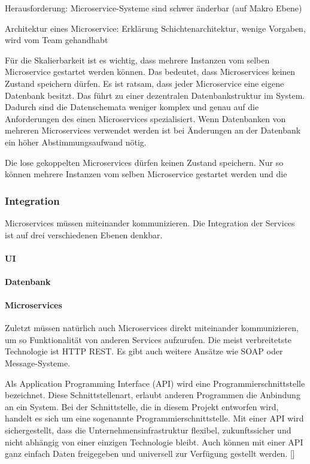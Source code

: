 Herausforderung: Microservice-Systeme sind schwer änderbar (auf Makro Ebene)

Architektur eines Microservice: Erklärung Schichtenarchitektur, wenige Vorgaben, wird vom Team gehandhabt

Für die Skalierbarkeit ist es wichtig, dass mehrere Instanzen vom selben Microservice gestartet werden können. Das bedeutet, dass Microservices keinen Zustand speichern dürfen.
Es ist ratsam, dass jeder Microservice eine eigene Datenbank besitzt. Das führt zu einer dezentralen Datenbankstruktur im System. Dadurch sind die Datenschemata weniger komplex und genau auf die Anforderungen des einen Microservices spezialisiert.  Wenn Datenbanken von mehreren Microservices verwendet werden ist bei Änderungen an der Datenbank ein höher Abstimmungsaufwand nötig.

Die lose gekoppelten Microservices dürfen keinen Zustand speichern. Nur so können mehrere Instanzen vom selben Microservice gestartet werden und die 

\subsubsection{Integration}

Microservices müssen miteinander kommunizieren. Die Integration der Services ist auf drei verschiedenen Ebenen denkbar.

\paragraph{UI}

\paragraph{Datenbank}

\paragraph{Microservices}

Zuletzt müssen natürlich auch Microservices direkt miteinander kommunizieren, um so Funktionalität von anderen Services aufzurufen. Die meist verbreitetste Technologie ist HTTP REST. Es gibt auch weitere Ansätze wie SOAP oder Message-Systeme.

Als Application Programming Interface (API) wird eine Programmierschnittstelle bezeichnet. Diese Schnittstellenart, erlaubt anderen Programmen die Anbindung an ein System. Bei der Schnittstelle, die in diesem Projekt entworfen wird, handelt es sich um eine sogenannte Programmierschnittstelle. Mit einer API wird sichergestellt, dass die Unternehmensinfrastruktur flexibel, zukunftssicher und nicht abhängig von einer einzigen Technologie bleibt. Auch können mit einer API ganz einfach Daten freigegeben und universell zur Verfügung gestellt werden. [\cite[S. 95ff]{koflerDigitale2018}]

